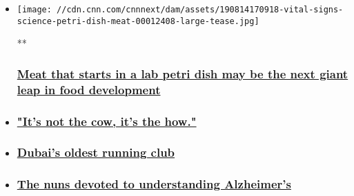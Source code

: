 \begin{itemize}
\item
  \href{/videos/health/2019/08/14/vital-signs-science-petri-dish-meat.cnn}{}

  \texttt{[image: //cdn.cnn.com/cnnnext/dam/assets/190814170918-vital-signs-science-petri-dish-meat-00012408-large-tease.jpg]}

  **

  \hypertarget{meat-that-starts-in-a-lab-petri-dish-may-be-the-next-giant-leap-in-food-development}{%
  \subsubsection{\texorpdfstring{\href{/videos/health/2019/08/14/vital-signs-science-petri-dish-meat.cnn}{Meat
  that starts in a lab petri dish may be the next giant leap in food
  development}}{Meat that starts in a lab petri dish may be the next giant leap in food development}}\label{meat-that-starts-in-a-lab-petri-dish-may-be-the-next-giant-leap-in-food-development}}
\item
  \hypertarget{its-not-the-cow-its-the-how}{%
  \subsubsection{\texorpdfstring{\href{/videos/health/2019/08/14/vital-signs-meat-beef-cow-plants.cnn}{"It's
  not the cow, it's the
  how."}}{"It's not the cow, it's the how."}}\label{its-not-the-cow-its-the-how}}
\item
  \hypertarget{dubais-oldest-running-club}{%
  \subsubsection{\texorpdfstring{\href{/videos/health/2018/03/27/vital-signs-dubai-running-club-desert-road-runners-c.cnn}{Dubai's
  oldest running
  club}}{Dubai's oldest running club}}\label{dubais-oldest-running-club}}
\item
  \hypertarget{the-nuns-devoted-to-understanding-alzheimers}{%
  \subsubsection{\texorpdfstring{\href{/videos/health/2018/02/01/vital-signs-the-nuns-devoted-to-understanding-alzheimers-b.cnn}{The
  nuns devoted to understanding
  Alzheimer's}}{The nuns devoted to understanding Alzheimer's}}\label{the-nuns-devoted-to-understanding-alzheimers}}
\end{itemize}

